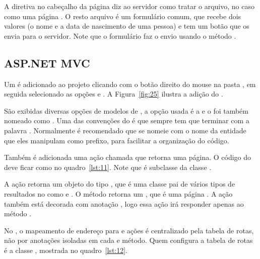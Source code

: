 
A diretiva  no cabeçalho da página diz ao servidor como tratar o arquivo, no caso como uma página . O resto arquivo é um formulário  comum, que recebe dois valores (o nome e a data de nascimento de uma pessoa) e tem um botão que os envia para o servidor. Note que o formulário faz o envio usando o método .

\subsection{ASP.NET MVC}

Um  é adicionado ao projeto  clicando com o botão direito do mouse na pasta , em seguida selecionado as opções  e . A Figura~\ref{fig:25} ilustra a adição do .


São exibidas diversas opções de modelos de , a opção usada é a  e o  foi também nomeado como . Uma das convenções do  é que  sempre tem que terminar com a palavra . Normalmente é recomendado que se nomeie  com o nome da entidade que eles manipulam como prefixo, para facilitar a organização do código.

Também é adicionada uma ação chamada  que retorna uma página. O código do  deve ficar como no quadro~\ref{lst:11}. Note que  é subclasse da classe .


A ação  retorna um objeto do tipo , que é uma classe pai de vários tipos de resultados no  como  e . O método  retorna um , que é uma página . A ação  também está decorada com anotação , logo essa ação irá responder apenas ao método .

No , o mapeamento de endereço para  e ações é centralizado pela tabela de rotas, não por anotações isoladas em cada  e método. Quem configura a tabela de rotas é a classe , mostrada no quadro~\ref{lst:12}.

